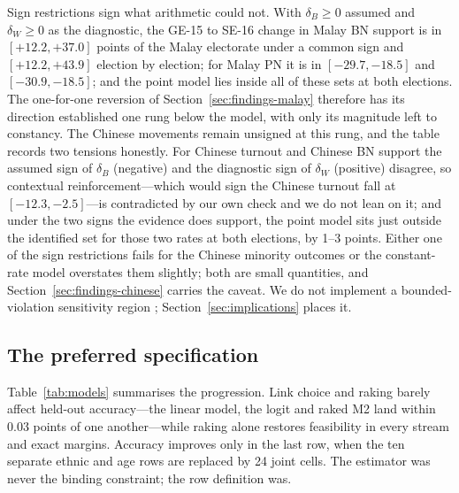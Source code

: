 \documentclass[11pt]{article}
\begin{document}
Sign restrictions sign what arithmetic could not. With $\delta_B \ge 0$ assumed and $\delta_W \ge 0$ as the diagnostic, the GE-15 to SE-16 change in Malay BN support is in $[+12.2, +37.0]$ points of the Malay electorate under a common sign and $[+12.2, +43.9]$ election by election; for Malay PN it is in $[-29.7, -18.5]$ and $[-30.9, -18.5]$; and the point model lies inside all of these sets at both elections. The one-for-one reversion of Section~\ref{sec:findings-malay} therefore has its direction established one rung below the model, with only its magnitude left to constancy. The Chinese movements remain unsigned at this rung, and the table records two tensions honestly. For Chinese turnout and Chinese BN support the assumed sign of $\delta_B$ (negative) and the diagnostic sign of $\delta_W$ (positive) disagree, so contextual reinforcement---which would sign the Chinese turnout fall at $[-12.3, -2.5]$---is contradicted by our own check and we do not lean on it; and under the two signs the evidence does support, the point model sits just outside the identified set for those two rates at both elections, by 1--3 points. Either one of the sign restrictions fails for the Chinese minority outcomes or the constant-rate model overstates them slightly; both are small quantities, and Section~\ref{sec:findings-chinese} carries the caveat. We do not implement a bounded-violation sensitivity region \cite{manski2018,jiangking2020}; Section~\ref{sec:implications} places it.

\subsection{The preferred specification}
\label{sec:strategy-preferred}

Table~\ref{tab:models} summarises the progression. Link choice and raking barely affect held-out accuracy---the linear model, the logit and raked M2 land within 0.03 points of one another---while raking alone restores feasibility in every stream and exact margins. Accuracy improves only in the last row, when the ten separate ethnic and age rows are replaced by 24 joint cells. The estimator was never the binding constraint; the row definition was.
\end{document}
